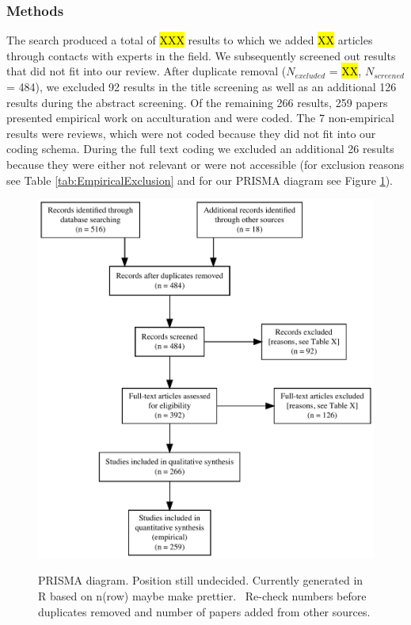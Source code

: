 \subsubsection{Methods}

The search produced a total of \hl{XXX} results to which we added
\hl{XX} articles through contacts with experts in the field. We
subsequently screened out results that did not fit into our review.
After duplicate removal (\(N_{excluded}\) = \hl{XX}, \(N_{screened}\) =
484), we excluded 92 results in the title screening as well as an
additional 126 results during the abstract screening. Of the remaining
266 results, 259 papers presented empirical work on acculturation and
were coded. The 7 non-empirical results were reviews, which were not
coded because they did not fit into our coding schema. During the full
text coding we excluded an additional 26 results because they were
either not relevant or were not accessible (for exclusion reasons see
Table \ref{tab:EmpiricalExclusion} and for our PRISMA diagram see Figure
\ref{fig:PRISMA}).

\begin{figure}[h]
\centering
\caption{PRISMA diagram. Position still undecided. Currently generated in R based on n(row) maybe make prettier. \Warning\ Re-check numbers before duplicates removed and number of papers added from other sources.}
\includegraphics[width=\textwidth]{Figures/PRISMA}
\label{fig:PRISMA}
\end{figure}


